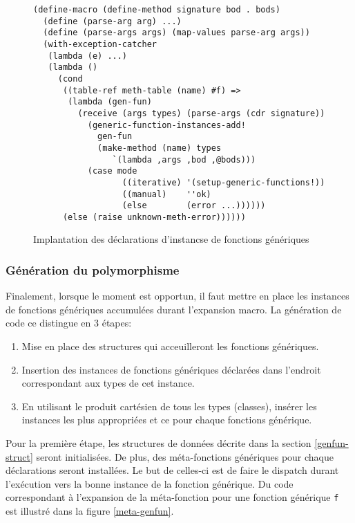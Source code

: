 \documentclass[letterpaper,12pt]{book}
\begin{document}
      \begin{figure}[h!]
        \begin{lstlisting}
(define-macro (define-method signature bod . bods)
  (define (parse-arg arg) ...)
  (define (parse-args args) (map-values parse-arg args))
  (with-exception-catcher
   (lambda (e) ...)
   (lambda ()
     (cond
      ((table-ref meth-table (name) #f) =>
       (lambda (gen-fun)
         (receive (args types) (parse-args (cdr signature))
           (generic-function-instances-add!
             gen-fun
             (make-method (name) types
                `(lambda ,args ,bod ,@bods)))
           (case mode
                  ((iterative) '(setup-generic-functions!))
                  ((manual)    ''ok)
                  (else        (error ...))))))
      (else (raise unknown-meth-error))))))
        \end{lstlisting}
        \caption{Implantation des déclarations d'instancse de
          fonctions génériques}
        \label{defmeth}
      \end{figure}

    \subsubsection{Génération du polymorphisme}
      Finalement, lorsque le moment est opportun, il faut mettre en
      place les instances de fonctions génériques accumulées durant
      l'expansion macro. La génération de code ce distingue en 3 étapes:

      \begin{enumerate}
      \item Mise en place des structures qui acceuilleront les
        fonctions génériques.
      \item Insertion des instances de fonctions génériques déclarées
        dans l'endroit correspondant aux types de cet instance.
      \item En utilisant le produit cartésien de tous les types
        (classes), insérer les instances les plus appropriées et ce
        pour chaque fonctions générique.
      \end{enumerate}

      Pour la première étape, les structures de données décrite dans
      la section \ref{genfun-struct} seront initialisées. De plus, des
      méta-fonctions génériques pour chaque déclarations seront
      installées. Le but de celles-ci est de faire le \og dispatch \fg
      durant l'exécution vers la bonne instance de la fonction
      générique. Du code correspondant à l'expansion de la
      méta-fonction pour une fonction générique \texttt{f} est
      illustré dans la figure \ref{meta-genfun}.
      
\end{document}
